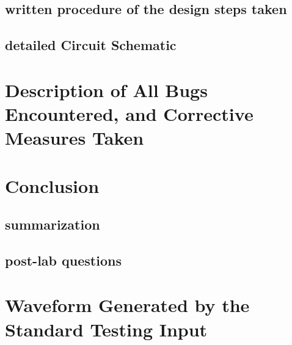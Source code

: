 \documentclass[12pt]{article}
\begin{document}
\subsection{written procedure of the design steps taken}

\subsection{detailed Circuit Schematic}


\section{Description of All Bugs Encountered, and Corrective Measures Taken}

\section{Conclusion}
\subsection{summarization}

\subsection{post-lab questions}


\section{Waveform Generated by the Standard Testing Input}

\newpage


\end{document}
